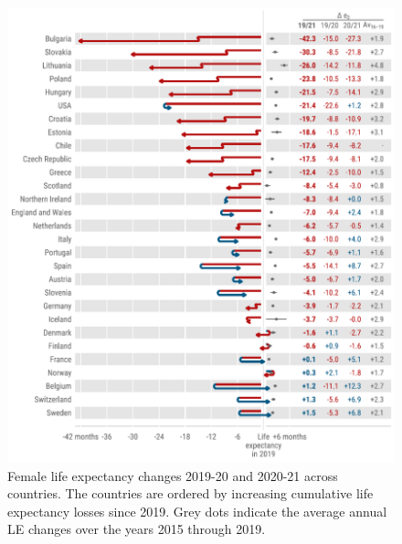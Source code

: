 \documentclass[12pt]{article}
\begin{document}
\begin{figure}[hb!]
    \centering
    \includegraphics{figure-a4.pdf}
    \caption{Female life expectancy changes 2019-20 and 2020-21 across countries. The countries are ordered by increasing cumulative life expectancy losses since 2019. Grey dots indicate the average annual LE changes over the years 2015 through 2019.}
    \label{fig:figure-a4}
\end{figure}
\end{document}
